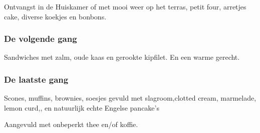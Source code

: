 Ontvangst in de Huiskamer of met mooi weer op het terras,
petit four, arretjes cake, diverse koekjes en bonbons.

\subsubsection*{De volgende gang}

Sandwiches met zalm, oude kaas en gerookte kipfilet.
En een warme gerecht.

\subsubsection*{De laatste gang}
Scones, muffins, brownies, soesjes gevuld met slagroom,clotted cream, marmelade, lemon curd,, en natuurlijk echte Engelse pancake’s

Aangevuld met onbeperkt thee en/of koffie.

